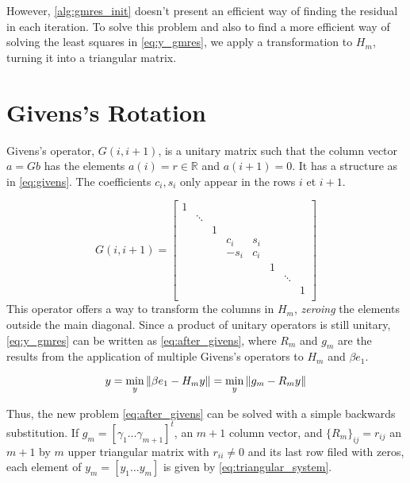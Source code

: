 However, \ref{alg:gmres_init} doesn't present an efficient way of finding the residual in each iteration. To solve this problem and also to find a more efficient way of solving the least squares in \ref{eq:y_gmres}, we apply a transformation to $H_{m}$, turning it into a triangular matrix.

\section{Givens's Rotation}

Givens's operator, $G(i,i+1)$, is a unitary matrix such that the column vector $a = Gb$ has the elements $a(i) = r \in \mathbb{R}$ and $a(i+1)=0$. It has a structure as in \ref{eq:givens}. The coefficients $c_{i},s_{i}$ only appear in the rows $i$ et $i+1$.

\begin{equation}\label{eq:givens}
    G(i,i+1)=
    \begin{bmatrix}
        1 &        &   &        &       &   &        &   \\
          & \ddots &   &        &       &   &        &   \\
          &        & 1 &        &       &   &        &   \\
          &        &   & c_{i}  & s_{i} &   &        &   \\
          &        &   & -s_{i} & c_{i} &   &        &   \\
          &        &   &        &       & 1 &        &   \\
          &        &   &        &       &   & \ddots &   \\
          &        &   &        &       &   &        & 1 \\
    \end{bmatrix}
\end{equation}
This operator offers a way to transform the columns in $H_{m}$, \textit{zeroing} the elements outside the main diagonal. Since a product of unitary operators is still unitary, \ref{eq:y_gmres} can be written as \ref{eq:after_givens}, where $R_{m}$ and $g_{m}$ are the results from the application of multiple Givens's operators to $H_{m}$ and $\beta e_{1}$.

\begin{equation}\label{eq:after_givens}
    y = \min_{y} \left\lVert\beta e_{1} - H_{m}y\right\rVert = \min_{y} \left\lVert g_{m} - R_{m}y\right\rVert
\end{equation}


Thus, the new problem \ref{eq:after_givens} can be solved with a simple backwards substitution. If $g_{m} = [\gamma_{1} \dots \gamma_{m+1}]^{t}$, an $m+1$ column vector, and $\{ R_{m} \}_{ij} = r_{ij}$ an $m+1$ by $m$ upper triangular matrix with $r_{ii} \neq 0$ and its last row filed with zeros, each element of $y_{m} = [y_{1} \dots y_{m}]$ is given by \ref{eq:triangular_system}.

